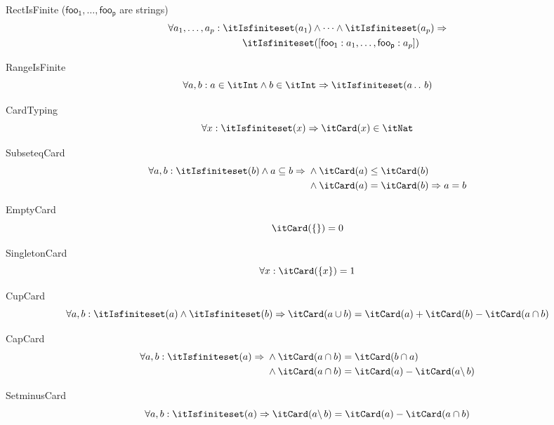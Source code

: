 \documentclass[11pt, a4paper, oneside]{article}
\begin{document}
\begin{axioms}
\item[RectIsFinite (\rm$\mathsf{foo_1},\dots,\mathsf{foo_p}$ are strings)] \[
        \begin{aligned}
            \forall a_1, \dots, a_p :\; &\itIsfiniteset(a_1) \wedge \dots \wedge \itIsfiniteset(a_p) \imp \\
            &\qquad \itIsfiniteset(\bx{ \mathsf{foo_1} : a_1, \dots, \mathsf{foo_p} : a_p })
        \end{aligned}
    \]

\item[RangeIsFinite] \[
        \forall a, b : a \in \itInt \wedge b \in \itInt \imp \itIsfiniteset(a \ltwodots b)
    \]

\item[CardTyping] \[
        \forall x : \itIsfiniteset(x) \imp \itCard(x) \in \itNat
    \]

\item[SubseteqCard] \[
        \forall a, b : \itIsfiniteset(b) \wedge a \subseteq b \imp \begin{aligned}[t]
            &\wedge \itCard(a) \le \itCard(b) \\
            &\wedge \itCard(a) = \itCard(b) \imp a = b
        \end{aligned}
    \]

\item[EmptyCard] \[
        \itCard(\st{}) = 0
    \]

\item[SingletonCard] \[
        \forall x : \itCard(\st{ x }) = 1
    \]

\item[CupCard] \[
        \forall a, b : \itIsfiniteset(a) \wedge \itIsfiniteset(b) \imp \itCard(a \cup b) = \itCard(a) + \itCard(b) - \itCard(a \cap b)
    \]

\item[CapCard] \[
        \forall a, b : \itIsfiniteset(a) \imp \begin{aligned}[t]
            &\wedge \itCard(a \cap b) = \itCard(b \cap a) \\
            &\wedge \itCard(a \cap b) = \itCard(a) - \itCard(a \backslash\, b)
        \end{aligned}
    \]

\item[SetminusCard] \[
        \forall a, b : \itIsfiniteset(a) \imp \itCard(a \backslash\, b) = \itCard(a) - \itCard(a \cap b)
    \]



\end{axioms}
\end{document}

